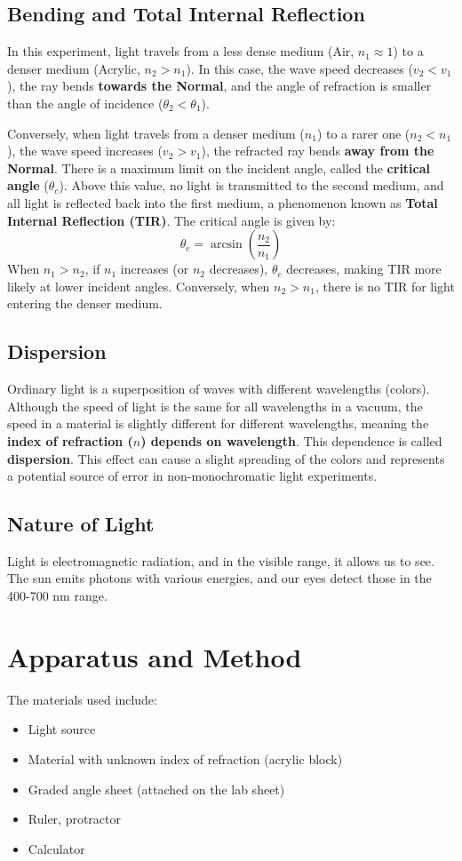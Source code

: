 \documentclass[12pt, a4paper]{article}
\begin{document}
\subsection{Bending and Total Internal Reflection}
In this experiment, light travels from a less dense medium (Air, $n_1 \approx 1$) to a denser medium (Acrylic, $n_2 > n_1$). In this case, the wave speed decreases ($v_2 < v_1$), the ray bends \textbf{towards the Normal}, and the angle of refraction is smaller than the angle of incidence ($\theta_2 < \theta_1$).

Conversely, when light travels from a denser medium ($n_1$) to a rarer one ($n_2 < n_1$), the wave speed increases ($v_2 > v_1$), the refracted ray bends \textbf{away from the Normal}. There is a maximum limit on the incident angle, called the \textbf{critical angle} ($\theta_c$). Above this value, no light is transmitted to the second medium, and all light is reflected back into the first medium, a phenomenon known as \textbf{Total Internal Reflection (TIR)}. The critical angle is given by:
\[ \theta_c = \arcsin\left(\frac{n_2}{n_1}\right) \]
When $n_1 > n_2$, if $n_1$ increases (or $n_2$ decreases), $\theta_c$ decreases, making TIR more likely at lower incident angles. Conversely, when $n_2 > n_1$, there is no TIR for light entering the denser medium.

\subsection{Dispersion}
Ordinary light is a superposition of waves with different wavelengths (colors). Although the speed of light is the same for all wavelengths in a vacuum, the speed in a material is slightly different for different wavelengths, meaning the \textbf{index of refraction ($n$) depends on wavelength}. This dependence is called \textbf{dispersion}. This effect can cause a slight spreading of the colors and represents a potential source of error in non-monochromatic light experiments.

\subsection{Nature of Light}
Light is electromagnetic radiation, and in the visible range, it allows us to see. The sun emits photons with various energies, and our eyes detect those in the 400-700 nm range.

\section{Apparatus and Method}
The materials used include:
\begin{itemize}
\item Light source
\item Material with unknown index of refraction (acrylic block)
\item Graded angle sheet (attached on the lab sheet)
\item Ruler, protractor
\item Calculator
\end{itemize}
\end{document}
